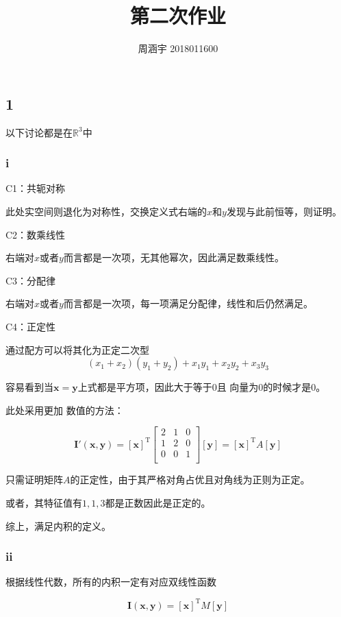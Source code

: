 \documentclass[UTF8,c5size]{ctexart}
\title{{\bfseries 第二次作业}}
\author{周涵宇 2018011600}
\date{}
\newcommand{\trans}[0]{^\mathrm{T}}
\begin{document}
\maketitle

\subsection*{1}

以下讨论都是在$\mathbb{R}^3$中

\subsubsection*{i}

C1：共轭对称

此处实空间则退化为对称性，交换定义式右端的$x$和$y$发现与此前恒等，则证明。

C2：数乘线性

右端对$x$或者$y$而言都是一次项，无其他幂次，因此满足数乘线性。

C3：分配律

右端对$x$或者$y$而言都是一次项，每一项满足分配律，线性和后仍然满足。

C4：正定性

通过配方可以将其化为正定二次型
$$
(x_1+x_2)(y_1+y_2)+x_1y_1+x_2y_2+x_3y_3
$$

容易看到当$\bm{x}=\bm{y}$上式都是平方项，因此大于等于0且
向量为0的时候才是0。

此处采用更加
数值的方法：

$$
\bm{I'(x,y)}
=
[\bm{x}]\trans
\begin{bmatrix}
    2&1&0\\
    1&2&0\\
    0&0&1\\
\end{bmatrix}
[\bm{y}]=[\bm{x}]\trans
A
[\bm{y}]
$$

只需证明矩阵$A$的正定性，由于其严格对角占优且对角线为正则为正定。

或者，其特征值有$1,1,3$都是正数因此是正定的。

综上，满足内积的定义。

\subsubsection*{ii}

根据线性代数，所有的内积一定有对应双线性函数

\begin{equation}
\bm{I(x,y)}
=
[\bm{x}]\trans
M
[\bm{y}]
\end{equation}
\end{document}
